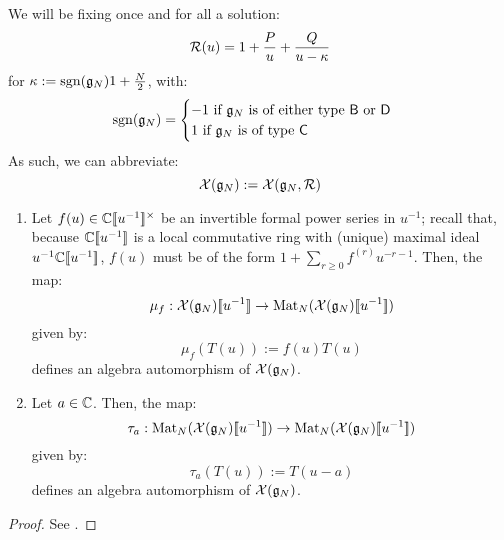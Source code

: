             We will be fixing once and for all a solution:
                $$\mathcal{R}(u) = 1 + \frac{P}{u} + \frac{Q}{u - \kappa}$$
            for $\kappa := \operatorname{sgn}(\mathfrak{g}_N) 1 + \frac{N}{2}$, with:
                \begin{equation} \label{equation: BCD_signature}
                    \operatorname{sgn}(\mathfrak{g}_N) =
                    \begin{cases}
                        \text{$-1$ if $\mathfrak{g}_N$ is of either type $\mathsf{B}$ or $\mathsf{D}$}
                        \\
                        \text{$1$ if $\mathfrak{g}_N$ is of type $\mathsf{C}$}
                    \end{cases}
                \end{equation}
            As such, we can abbreviate:
                $$\mathcal{X}(\mathfrak{g}_N) := \mathcal{X}(\mathfrak{g}_N, \mathcal{R})$$

            \begin{lemma} \label{lemma: automorphisms_of_extended_untwisted_yangians}
                \begin{enumerate}
                    \item Let $f(u) \in \bbC[\![u^{-1}]\!]^{\x}$ be an invertible formal power series in $u^{-1}$; recall that, because $\mathbb{C}[\![u^{-1}]\!]$ is a local commutative ring with (unique) maximal ideal $u^{-1}\mathbb{C}[\![u^{-1}]\!]$, $f(u)$ must be of the form $1 + \sum_{r \geq 0} f^{(r)} u^{-r - 1}$. Then, the map:
                        $$\mu_f: \mathcal{X}(\mathfrak{g}_N)[\![u^{-1}]\!] \to \mathrm{Mat}_N(\mathcal{X}(\mathfrak{g}_N)[\![u^{-1}]\!])$$
                    given by:
                        $$\mu_f( T(u) ) := f(u) T(u)$$
                    defines an algebra automorphism of $\mathcal{X}(\mathfrak{g}_N)$.
                    \item Let $a \in \mathbb{C}$. Then, the map:
                        $$\tau_a: \mathrm{Mat}_N(\mathcal{X}(\mathfrak{g}_N)[\![u^{-1}]\!]) \to \mathrm{Mat}_N(\mathcal{X}(\mathfrak{g}_N)[\![u^{-1}]\!])$$
                    given by:
                        $$\tau_a( T(u) ) := T(u - a)$$
                    defines an algebra automorphism of $\mathcal{X}(\mathfrak{g}_N)$.
                \end{enumerate}
            \end{lemma}
                \begin{proof}
                    See \cite[Section 2]{guay_regelskis_twisted_yangians_for_symmetric_pairs_of_types_BCD}.
                \end{proof}

